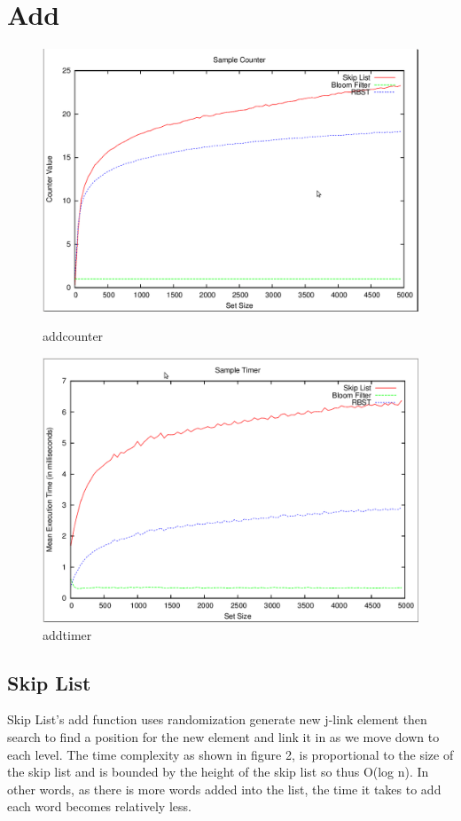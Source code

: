 \documentclass[11pt]{article}
\begin{document}
\section*{Add}
\begin{figure}[H]
\begin{minipage}{.5\linewidth}
\centering
\includegraphics[width=1\linewidth]{addcounter.png}
\caption{addcounter}
\end{minipage}
\hspace{0.5cm}
\begin{minipage}{.5\linewidth}
\centering
\includegraphics[width=1\linewidth]{addtimer.png}
\caption{addtimer}
\end{minipage}
\end{figure}
\subsection*{Skip List}
Skip List's add function uses randomization generate new j-link element then search to find a position for the new element and link it in as we move down to each level. The time complexity as shown in figure 2, is proportional to the size of the skip list and is bounded by the height of the skip list so thus O(log n). In other words, as there is more words added into the list, the time it takes to add each word becomes relatively less.
\end{document}

